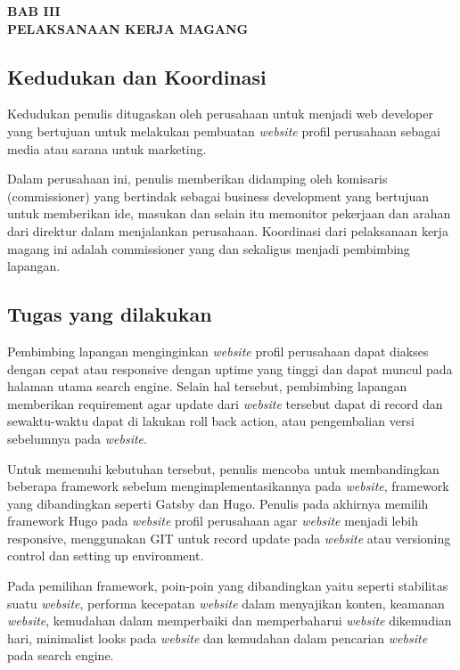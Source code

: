 \begin{center}
    \textbf{BAB III \\ PELAKSANAAN KERJA MAGANG}
\end{center}
\setcounter{section}{3}
\setcounter{subsection}{0}
\setcounter{figure}{0}

\subsection{Kedudukan dan Koordinasi}

Kedudukan penulis ditugaskan oleh perusahaan untuk menjadi web developer yang bertujuan 
untuk melakukan pembuatan \emph{website} profil perusahaan sebagai media atau sarana untuk marketing.

Dalam perusahaan ini, penulis memberikan didamping oleh komisaris (commissioner) 
yang bertindak sebagai business development yang bertujuan untuk memberikan ide, 
masukan dan selain itu memonitor pekerjaan dan arahan dari direktur dalam menjalankan perusahaan. 
Koordinasi dari pelaksanaan kerja magang ini adalah commissioner yang dan 
sekaligus menjadi pembimbing lapangan.

\subsection{Tugas yang dilakukan} 

Pembimbing lapangan menginginkan \emph{website} profil perusahaan dapat diakses dengan cepat atau responsive dengan 
uptime yang tinggi dan dapat muncul pada halaman utama search engine. 
Selain hal tersebut, pembimbing lapangan memberikan requirement agar update 
dari \emph{website} tersebut dapat di record dan sewaktu-waktu dapat di lakukan roll back action, 
atau pengembalian versi sebelumnya pada \emph{website}.

Untuk memenuhi kebutuhan tersebut, penulis mencoba untuk membandingkan beberapa 
framework sebelum mengimplementasikannya pada \emph{website}, 
framework yang dibandingkan seperti Gatsby dan Hugo. 
Penulis pada akhirnya memilih framework Hugo pada \emph{website} profil perusahaan agar 
\emph{website} menjadi lebih responsive, menggunakan GIT untuk record update pada \emph{website} atau 
versioning control dan setting up environment.~\cite{progit} 

\pagebreak

Pada pemilihan framework, poin-poin yang dibandingkan yaitu seperti stabilitas suatu 
\emph{website}, performa kecepatan \emph{website} dalam menyajikan konten, keamanan \emph{website}, 
kemudahan dalam memperbaiki dan memperbaharui \emph{website} dikemudian hari, 
minimalist looks pada \emph{website} dan kemudahan dalam pencarian \emph{website} pada search engine.

